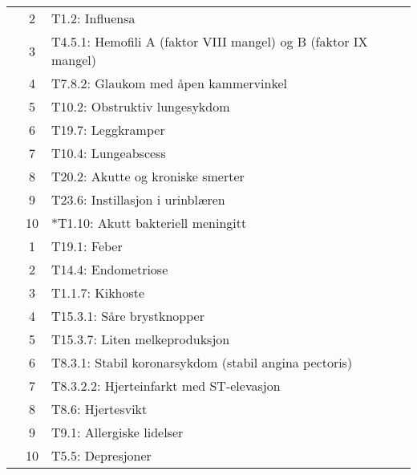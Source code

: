 \begin{table}[htbp]
\begin{tabular}{c c l}
	 & 2 & T1.2: Influensa \\
	 & 3 & T4.5.1: Hemofili A (faktor VIII mangel) og B (faktor IX mangel) \\
	 & 4 & T7.8.2: Glaukom med åpen kammervinkel \\
	 & 5 & T10.2: Obstruktiv lungesykdom \\
	 & 6 & T19.7: Leggkramper \\
	 & 7 & T10.4: Lungeabscess \\
	 & 8 & T20.2: Akutte og kroniske smerter \\
	 & 9 & T23.6: Instillasjon i urinblæren \\
	 & 10 & *T1.10: Akutt bakteriell meningitt \\
	\addlinespace
	4 & 1 & T19.1: Feber \\
	 & 2 & T14.4: Endometriose \\
	 & 3 & T1.1.7: Kikhoste \\
	 & 4 & T15.3.1: Såre brystknopper \\
	 & 5 & T15.3.7: Liten melkeproduksjon \\
	 & 6 & T8.3.1: Stabil koronarsykdom (stabil angina pectoris) \\
	 & 7 & T8.3.2.2: Hjerteinfarkt med ST-elevasjon \\
	 & 8 & T8.6: Hjertesvikt \\
	 & 9 & T9.1: Allergiske lidelser \\
	 & 10 & T5.5: Depresjoner \\
	\bottomrule
\end{tabular}
\end{table}

